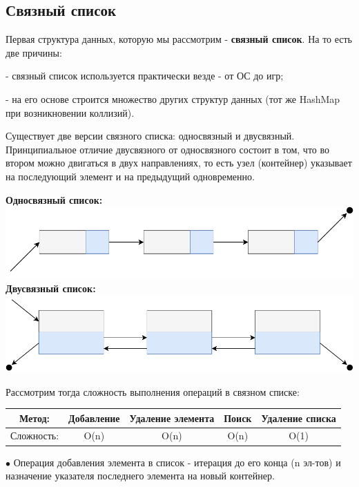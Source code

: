 \documentclass[utf8,14pt,a4paper,oneside,russian]{book}
\begin{document}
	\subsection{Связный список}
	
	Первая структура данных, которую мы рассмотрим - \textbf{связный список}. На то есть две причины:
	
	- связный список используется практически везде - от ОС до игр;
	
	- на его основе строится множество других структур данных (тот же HashMap при возникновении коллизий).
	
	Существует две версии связного списка: односвязный и двусвязный. Принципиальное отличие двусвязного от односвязного состоит в том, что во втором можно двигаться в двух направлениях, то есть узел (контейнер) указывает на последующий элемент и на предыдущий одновременно.
	
	\begin{center}
		\textbf{Односвязный список:}\\
		\includegraphics[scale=1]{linked_list_1}\\
		\textbf{Двусвязный список:}\\
		\includegraphics[scale=1]{linked_list_2}\\
	\end{center}
	
	Рассмотрим тогда сложность выполнения операций в связном списке:
	
	\begin{longtable}{c|c|c|c|c}
		Метод: &Добавление&Удаление элемента&Поиск&Удаление списка\\\hline
		Сложность: &O(n)&O(n)&O(n)&O(1)\\
	\end{longtable}

	$\bullet$ Операция добавления элемента в список - итерация до его конца (n эл-тов) и назначение указателя последнего элемента на новый контейнер.
	
\end{document}
